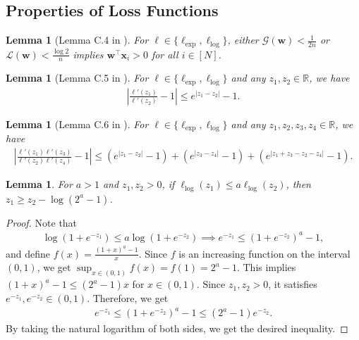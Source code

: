 \documentclass{article} %
\theoremstyle{plain}
\newtheorem{lemma}[theorem]{Lemma}
\theoremstyle{definition}
\theoremstyle{remark}
\def\bigabs#1{\left|#1\right|}
\def\bigopen#1{\left(#1\right)}
\def\gG{{\mathcal{G}}}
\newcommand{\Ls}{\mathcal{L}}
\newcommand{\R}{\mathbb{R}}
\def\bx{{\mathbf x}}
\def\bw{{\mathbf w}}
\begin{document}
\subsection{Properties of Loss Functions}
\begin{lemma}[Lemma C.4 in \citet{zhang2024the}]\label{lemma:small_loss_linsep}
    For $\ell \in \{\ell_{\text{exp}}, \ell_{\text{log}}\}$, either $\gG(\bw) < \frac{1}{2n}$ or $\Ls(\bw) < \frac{\log2}{n}$ implies $ \bw^\top \bx_i > 0$ for all $i\in[N]$.
\end{lemma}

\begin{lemma}[Lemma C.5 in \citet{zhang2024the}] \label{lemma:losses_prop}
    For $\ell \in \{\ell_{\text{exp}}, \ell_{\text{log}}\}$ and any $z_1, z_2 \in \R$, we have
    \begin{align*}
        \bigabs{\frac{\ell'(z_1)}{\ell'(z_2)}-1} \leq e^{|z_1-z_2|}-1.
    \end{align*}
\end{lemma}

\begin{lemma}[Lemma C.6 in \citet{zhang2024the}] \label{lemma:losses_prop2}
    For $\ell \in \{\ell_{\text{exp}}, \ell_{\text{log}}\}$ and any $z_1, z_2, z_3, z_4 \in \R$, we have
    \begin{align*}
        \bigabs{\frac{\ell'(z_1)\ell'(z_3)}{\ell'(z_2)\ell'(z_4)}-1} \leq \bigopen{e^{|z_1-z_2|}-1}+\bigopen{e^{|z_3-z_4|}-1} + \bigopen{e^{|z_1+z_3-z_2-z_4|}-1}.
    \end{align*}
\end{lemma}

\begin{lemma}\label{lemma:logistic}
    For $a>1$ and $z_1, z_2 > 0$, if $\ell_{\text{log}}(z_1) \leq a\ell_{\text{log}}(z_2)$, then $z_1 \geq z_2 - \log(2^a-1)$.
\end{lemma}

\begin{proof}
    Note that
    \begin{align*}
        \log(1+e^{-z_1}) \leq a \log(1+e^{-z_2})
        \implies e^{-z_1} \leq (1+e^{-z_2})^a -1,
    \end{align*}
    and define $f(x) = \frac{(1+x)^a-1}{x}$. Since $f$ is an increasing function on the interval $(0, 1)$, we get $\sup_{x \in (0, 1)}f(x) = f(1) = 2^a-1$. This implies $(1+x)^a-1 \leq (2^a-1)x$ for $x \in (0,1)$. Since $z_1, z_2 >0$, it satisfies $e^{-z_1}, e^{-z_2} \in (0, 1)$. Therefore, we get
    \begin{align*}
        e^{-z_1} \leq (1+e^{-z_2})^a -1 \leq (2^a-1)e^{-z_2}.
    \end{align*}
    By taking the natural logarithm of both sides, we get the desired inequality.
\end{proof}
\end{document}
